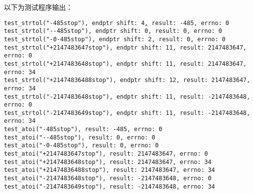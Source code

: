 以下为测试程序输出：
\begin{verbatim}
test_strtol("-485stop"), endptr shift: 4, result: -485, errno: 0
test_strtol("--485stop"), endptr shift: 0, result: 0, errno: 0
test_strtol("-0-485stop"), endptr shift: 2, result: 0, errno: 0
test_strtol("+2147483647stop"), endptr shift: 11, result: 2147483647, errno: 0
test_strtol("+2147483648stop"), endptr shift: 11, result: 2147483647, errno: 34
test_strtol("+21474836488stop"), endptr shift: 12, result: 2147483647, errno: 34
test_strtol("-2147483648stop"), endptr shift: 11, result: -2147483648, errno: 0
test_strtol("-2147483649stop"), endptr shift: 11, result: -2147483648, errno: 34
test_atoi("-485stop"), result: -485, errno: 0
test_atoi("--485stop"), result: 0, errno: 0
test_atoi("-0-485stop"), result: 0, errno: 0
test_atoi("+2147483647stop"), result: 2147483647, errno: 0
test_atoi("+2147483648stop"), result: 2147483647, errno: 34
test_atoi("+21474836488stop"), result: 2147483647, errno: 34
test_atoi("-2147483648stop"), result: -2147483648, errno: 0
test_atoi("-2147483649stop"), result: -2147483648, errno: 34
\end{verbatim}

                   





















